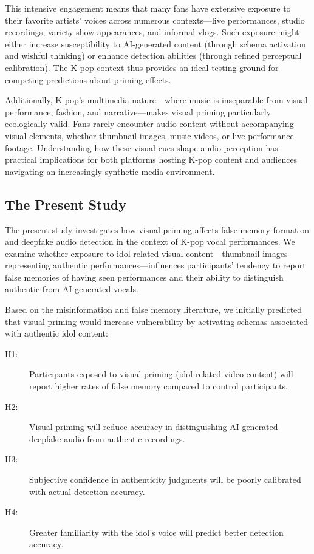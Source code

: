 \documentclass[12pt, a4paper]{article}
\begin{document}
This intensive engagement means that many fans have extensive exposure to their favorite artists' voices across numerous contexts---live performances, studio recordings, variety show appearances, and informal vlogs. Such exposure might either increase susceptibility to AI-generated content (through schema activation and wishful thinking) or enhance detection abilities (through refined perceptual calibration). The K-pop context thus provides an ideal testing ground for competing predictions about priming effects.

Additionally, K-pop's multimedia nature---where music is inseparable from visual performance, fashion, and narrative---makes visual priming particularly ecologically valid. Fans rarely encounter audio content without accompanying visual elements, whether thumbnail images, music videos, or live performance footage. Understanding how these visual cues shape audio perception has practical implications for both platforms hosting K-pop content and audiences navigating an increasingly synthetic media environment.

\subsection{The Present Study}

The present study investigates how visual priming affects false memory formation and deepfake audio detection in the context of K-pop vocal performances. We examine whether exposure to idol-related visual content---thumbnail images representing authentic performances---influences participants' tendency to report false memories of having seen performances and their ability to distinguish authentic from AI-generated vocals.

Based on the misinformation and false memory literature, we initially predicted that visual priming would increase vulnerability by activating schemas associated with authentic idol content:

\begin{description}
    \item[H1:] Participants exposed to visual priming (idol-related video content) will report higher rates of false memory compared to control participants.

    \item[H2:] Visual priming will reduce accuracy in distinguishing AI-generated deepfake audio from authentic recordings.

    \item[H3:] Subjective confidence in authenticity judgments will be poorly calibrated with actual detection accuracy.

    \item[H4:] Greater familiarity with the idol's voice will predict better detection accuracy.
\end{description}
\end{document}
